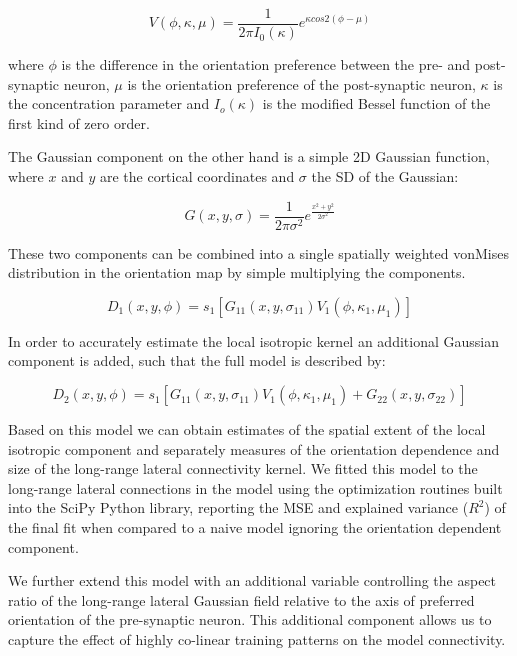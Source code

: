 \begin{equation}
V(\phi, \kappa, \mu) = \frac{1}{2 \pi I_0(\kappa)} e^{\kappa cos 2(\phi - \mu)}
\end{equation}

where $\phi$ is the difference in the orientation preference between
the pre- and post-synaptic neuron, $\mu$ is the orientation preference
of the post-synaptic neuron, $\kappa$ is the concentration parameter
and $I_o(\kappa)$ is the modified Bessel function of the first kind of
zero order.

The Gaussian component on the other hand is a simple 2D Gaussian
function, where $x$ and $y$ are the cortical coordinates and $\sigma$
the SD of the Gaussian:

\begin{equation}
G(x, y, \sigma) = \frac{1}{2 \pi \sigma^2} e^{\frac{x^2+y^2}{2
    \sigma^2}}
\end{equation}

These two components can be combined into a single spatially weighted
vonMises distribution in the orientation map by simple multiplying the
components.

\begin{equation}
D_1(x, y, \phi) = s_1 [G_{11}(x, y, \sigma_{11}) V_1(\phi, \kappa_1, \mu_1)]
\end{equation}

In order to accurately estimate the local isotropic kernel an
additional Gaussian component is added, such that the full model is
described by:

\begin{equation}
D_2(x, y, \phi) = s_1 [G_{11}(x, y, \sigma_{11}) V_1(\phi, \kappa_1, \mu_1) + G_{22}(x, y, \sigma_{22})]
\end{equation}

Based on this model we can obtain estimates of the spatial extent of
the local isotropic component and separately measures of the
orientation dependence and size of the long-range lateral connectivity
kernel. We fitted this model to the long-range lateral connections in
the model using the optimization routines built into the SciPy Python
library, reporting the MSE and explained variance ($R^2$) of the final
fit when compared to a naive model ignoring the orientation dependent
component.

We further extend this model with an additional variable controlling
the aspect ratio of the long-range lateral Gaussian field relative to
the axis of preferred orientation of the pre-synaptic neuron. This
additional component allows us to capture the effect of highly
co-linear training patterns on the model connectivity.

